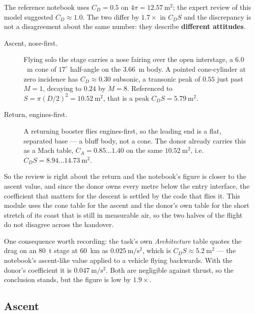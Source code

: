 \documentclass[11pt,a4paper]{article}
\begin{document}
The reference notebook uses $C_D=0.5$ on $4\pi=12.57\ \mathrm{m^2}$; the expert
review of this model suggested $C_D\approx1.0$. The two differ by $1.7\times$ in
$C_D S$ and the discrepancy is not a disagreement about the same number: they
describe \textbf{different attitudes}.

\begin{description}
\item[Ascent, nose-first.] Flying solo the stage carries a nose fairing over the
  open interstage, a $6.0$~m cone of $17^\circ$ half-angle on the $3.66$~m body.
  A pointed cone-cylinder at zero incidence has $C_D\approx0.30$ subsonic, a
  transonic peak of $0.55$ just past $M=1$, decaying to $0.24$ by $M=8$.
  Referenced to $S=\pi(D/2)^2=10.52\ \mathrm{m^2}$, that is a peak
  $C_D S = 5.79\ \mathrm{m^2}$.
\item[Return, engines-first.] A returning booster flies engines-first, so the
  leading end is a flat, separated base --- a bluff body, not a cone. The donor
  already carries this as a Mach table, $C_A = 0.85\ldots1.40$ on the same
  $10.52\ \mathrm{m^2}$, i.e.\ $C_D S = 8.94\ldots14.73\ \mathrm{m^2}$.
\end{description}

So the review is right about the return and the notebook's figure is closer to
the ascent value, and since the donor owns every metre below the entry interface,
the coefficient that matters for the descent is settled by the code that flies
it. This module uses the cone table for the ascent and the donor's own table for
the short stretch of its coast that is still in measurable air, so the two halves
of the flight do not disagree across the handover.

One consequence worth recording: the task's own \emph{Architecture} table quotes
the drag on an $80$~t stage at $60$~km as $0.025\ \mathrm{m/s^2}$, which is
$C_D S \approx 5.2\ \mathrm{m^2}$ --- the notebook's ascent-like value applied to
a vehicle flying backwards. With the donor's coefficient it is
$0.047\ \mathrm{m/s^2}$. Both are negligible against thrust, so the conclusion
stands, but the figure is low by $1.9\times$.

\subsection{Ascent}
\end{document}
